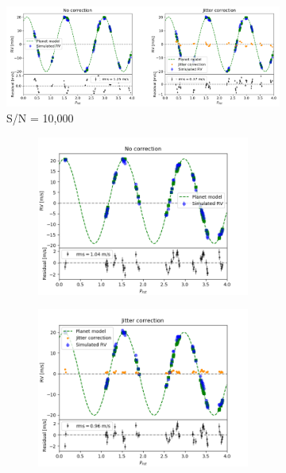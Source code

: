 \begin{figure}[tbp]	
\centering
    \begin{subfigure}[b]{1.0\textwidth}
		\includegraphics[width = 0.99 \linewidth]{./Figures/Methods/Fitting_p20j2sn10000.png}
        \caption{S/N = 10,000}
    \end{subfigure}
    \begin{subfigure}[b]{1.0\textwidth}
    		\begin{subfigure}[b]{0.49\textwidth}
        		\includegraphics[width=\textwidth]{./Figures/Methods/Fitting_5-Fit2_a20.png}
		\end{subfigure}
		\begin{subfigure}[b]{0.49\textwidth}        		
        		\includegraphics[width=\textwidth]{./Figures/Methods/Fitting_5-Fit1_XYZ_a20.png}

\end{subfigure}
\end{subfigure}
\end{figure}

